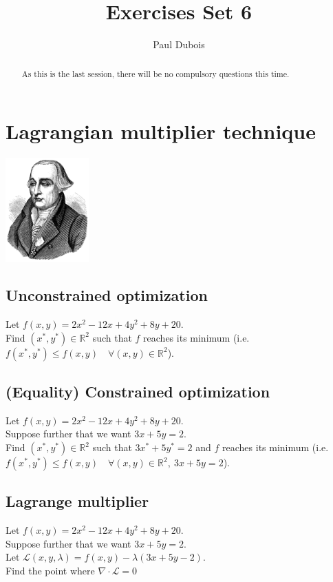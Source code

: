 \documentclass[]{article}
\title{Exercises Set 6}
\author{Paul Dubois}
\newcommand{\R}{\mathbb{R}}
\begin{document}
	
	\maketitle
	
	\begin{abstract}
		As this is the last session, there will be no compulsory questions this time.
	\end{abstract}	
	
	\section{Lagrangian multiplier technique}
	\begin{center}
		\includegraphics[height=4cm]{Lagrange}
	\end{center}

	\subsection{Unconstrained optimization}
	Let $f(x,y) = 2x^2-12x + 4y^2 + 8y + 20$.\\
	Find $(x^*,y^*) \in \R^2$ such that $f$ reaches its minimum (i.e. $f(x^*,y^*) \leq f(x,y) \quad \forall (x,y) \in \R^2$).
	
	\subsection{(Equality) Constrained optimization}
	Let $f(x,y) = 2x^2-12x + 4y^2 + 8y + 20$.\\
	Suppose further that we want $3x + 5y = 2$.\\
	Find $(x^*,y^*) \in \R^2$ such that $3x^* + 5y^* = 2$ and $f$ reaches its minimum (i.e. $f(x^*,y^*) \leq f(x,y) \quad \forall (x,y) \in \R^2,\ 3x + 5y = 2$).
	
	\subsection{Lagrange multiplier}
	Let $f(x,y) = 2x^2-12x + 4y^2 + 8y + 20$.\\
	Suppose further that we want $3x + 5y = 2$.\\
	Let $\mathcal{L}(x,y,\lambda) = f(x,y) - \lambda (3x +5y - 2)$.\\
	Find the point where $\nabla \cdot \mathcal{L} = 0$
	
\end{document}
